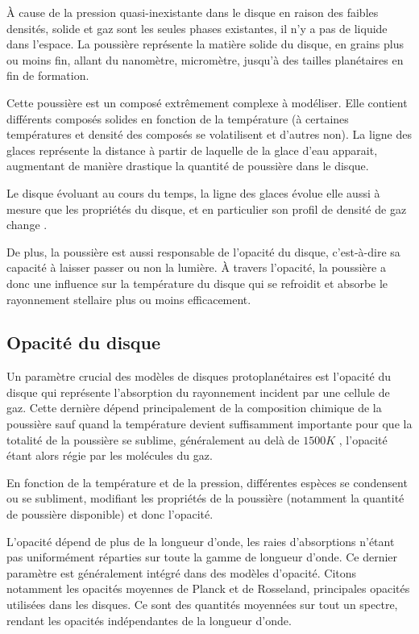 À cause de la pression quasi-inexistante dans le disque en raison des faibles densités, solide et gaz sont les seules phases
existantes, il n'y a pas de liquide dans l'espace. La poussière représente la matière solide du disque, en grains plus ou moins
fin, allant du nanomètre, micromètre, jusqu'à des tailles planétaires en fin de formation. 

Cette poussière est un composé extrêmement complexe à modéliser. Elle contient différents composés solides en fonction de la température (à certaines températures et densité des composés se volatilisent et d'autres non). La ligne des glaces représente la distance à partir de laquelle de la glace d'eau apparait, augmentant de manière drastique la quantité de poussière dans le disque. 

Le disque évoluant au cours du temps, la ligne des glaces évolue elle aussi à mesure que les propriétés du disque, et en
particulier son profil de densité de gaz change \citep{dodsonrobinson2009icelines}.

\bigskip

De plus, la poussière est aussi responsable de l'opacité du disque, c'est-à-dire sa capacité à laisser passer ou non la lumière.
À travers l'opacité, la poussière a donc une influence sur la température du disque qui se refroidit et absorbe le rayonnement
stellaire plus ou moins efficacement. 

\subsection{Opacité du disque}\label{sec:opacity}
Un paramètre crucial des modèles de disques protoplanétaires est l'opacité du disque qui représente l'absorption du rayonnement incident par une cellule de gaz. Cette dernière dépend principalement de la composition chimique de la poussière sauf quand la température devient suffisamment importante pour que la totalité de la poussière se sublime, généralement au delà de $1500\unit{K}$ \citep{pollack1994composition}, l'opacité étant alors régie par les molécules du gaz.

En fonction de la température et de la pression, différentes espèces se condensent ou se subliment, modifiant les propriétés de la poussière (notamment la quantité de poussière disponible) et donc l'opacité.

L'opacité dépend de plus de la longueur d'onde, les raies d'absorptions n'étant pas uniformément réparties sur toute la gamme de longueur d'onde. Ce dernier paramètre est généralement intégré dans des modèles d'opacité. Citons notamment les opacités moyennes de Planck et de Rosseland, principales opacités utilisées dans les disques. Ce sont des quantités moyennées sur tout un spectre, rendant les opacités indépendantes de la longueur d'onde. 

